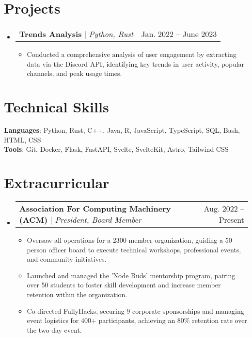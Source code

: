 \documentclass[letterpaper,11pt]{article}
\makeatletter
\newcommand{\resumeItem}[1]{
  \item\small{
    {#1 \vspace{-2pt}}
  }
}
\newcommand{\resumeProjectHeading}[2]{
    \item
    \begin{tabular*}{0.97\textwidth}{l@{\extracolsep{\fill}}r}
      \small#1 & #2 \\
    \end{tabular*}\vspace{-7pt}
}
\newcommand{\resumeSubHeadingListStart}{\begin{itemize}[leftmargin=0.15in, label={}]}
\newcommand{\resumeSubHeadingListEnd}{\end{itemize}}
\newcommand{\resumeItemListStart}{\begin{itemize}}
\newcommand{\resumeItemListEnd}{\end{itemize}\vspace{-5pt}}
\makeatother
\begin{document}
\section{Projects}
    \resumeSubHeadingListStart
        \resumeProjectHeading
              {\textbf{Trends Analysis} $|$ \emph{Python, Rust}}{Jan. 2022 -- June 2023}
              \resumeItemListStart
                \resumeItem{Conducted a comprehensive analysis of user engagement by extracting data via the Discord API, identifying key trends in user activity, popular channels, and peak usage times.}
              \resumeItemListEnd
    \resumeSubHeadingListEnd

\section{Technical Skills}
 \begin{itemize}[leftmargin=0.15in, label={}]
    \small{\item{
     \textbf{Languages}{: Python, Rust, C++, Java, R, JavaScript, TypeScript, SQL, Bash, HTML, CSS } \\
     \textbf{Tools}{: Git, Docker, Flask, FastAPI, Svelte, SvelteKit, Astro, Tailwind CSS}
    }}
 \end{itemize}

\section{Extracurricular}
    \resumeSubHeadingListStart
      \resumeProjectHeading
          {\textbf{Association For Computing Machinery (ACM) } $|$ \emph{President, Board Member}}{Aug. 2022 -- Present}
          \resumeItemListStart
            \resumeItem{Oversaw all operations for a 2300-member organization, guiding a 50-person officer board to execute technical workshops, professional events, and community initiatives.}
            \resumeItem{Launched and managed the 'Node Buds' mentorship program, pairing over 50 students to foster skill development and increase member retention within the organization.}
            \resumeItem{Co-directed FullyHacks, securing 9 corporate sponsorships and managing event logistics for 400+ participants, achieving an 80\% retention rate over the two-day event.}
          \resumeItemListEnd
    \resumeSubHeadingListEnd


\end{document}
